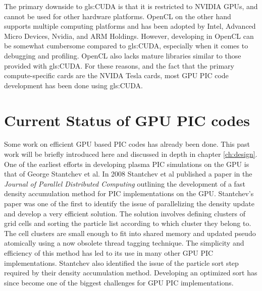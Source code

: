 The primary downside to \gls{gls:CUDA} is that it is restricted to NVIDIA GPUs, and cannot be used for other hardware platforms. OpenCL on the other hand supports multiple computing platforms and has been adopted by Intel, Advanced Micro Devices, Nvidia, and ARM Holdings. However, developing in OpenCL can be somewhat cumbersome compared to \gls{gls:CUDA}, especially when it comes to debugging and profiling. OpenCL also lacks mature libraries similar to those provided with \gls{gls:CUDA}. For these reasons, and the fact that the primary compute-specific cards are the NVIDA Tesla cards, most GPU PIC code development has been done using \gls{gls:CUDA}.\cite{NVIDIACorporation2012d,NVIDIACorporation2011}

		\section{Current Status of GPU PIC codes}

						Some work on efficient GPU based PIC codes has already been done. This past work will be briefly introduced here and discussed in depth in chapter \ref{ch:design}. One of the earliest efforts in developing plasma PIC simulations on the GPU is that of George Stantchev et al. In 2008 Stantchev et al published a paper in the \emph{Journal of Parallel Distributed Computing}\cite{Stantchev2008} outlining the development of a fast density accumulation method for PIC implementations on the GPU. Stantchev's paper was one of the first to identify the issue of parallelizing the density update and develop a very efficient solution. The solution involves defining clusters of grid cells and sorting the particle list according to which cluster they belong to. The cell clusters are small enough to fit into shared memory and updated pseudo atomically using a now obsolete thread tagging technique. The simplicity and efficiency of this method has led to its use in many other GPU PIC implementations. Stantchev also identified the issue of the particle sort step required by their density accumulation method. Developing an optimized sort has since become one of the biggest challenges for GPU PIC implementations. 

